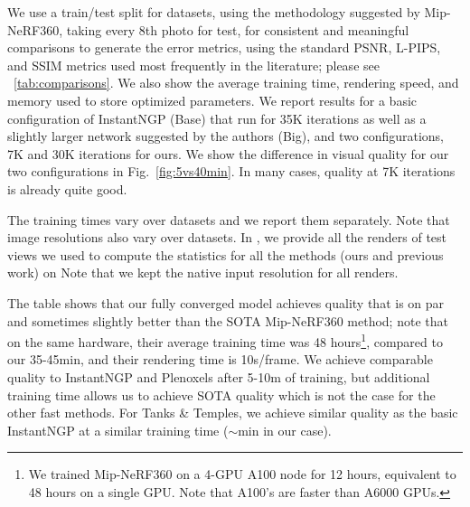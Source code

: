 We use a train/test split for datasets, using the methodology suggested by Mip-NeRF360, taking every 8th photo for test, for consistent and meaningful comparisons to generate the error metrics, using the standard PSNR, L-PIPS, and SSIM metrics used most frequently in the literature; please see ~\ref{tab:comparisons}. 
We also show the average training time, rendering speed, and memory used to store optimized parameters. We report results for a basic configuration of InstantNGP (Base) that run for 35K iterations as well as a slightly larger network suggested by the authors (Big), and two configurations, 7K and 30K iterations for ours.
We show the difference in visual quality for our two configurations in Fig.~\ref{fig:5vs40min}. In many cases, quality at 7K iterations is already quite good.

The training times vary over datasets and we report them separately. Note that image resolutions also vary over datasets.
In , we provide all the renders of test views we used to compute the statistics for all the methods (ours and previous work) on  Note that we kept the native input resolution for all renders.







The table shows that our fully converged model achieves quality that is on par and sometimes slightly better than the SOTA Mip-NeRF360 method; note that on the same hardware, their average training time was 48 hours\footnote{We trained Mip-NeRF360 on a 4-GPU A100 node for 12 hours, equivalent to 48 hours on a single GPU. Note that A100's are faster than A6000 GPUs.}, compared to our 35-45min, and their rendering time is 10s/frame. We achieve comparable quality to InstantNGP and Plenoxels after 5-10m of training, but additional training time allows us to achieve SOTA quality which is not the case for the other fast methods. For Tanks \& Temples, we achieve similar quality as the basic InstantNGP at a similar training time ($\sim$min in our case).

